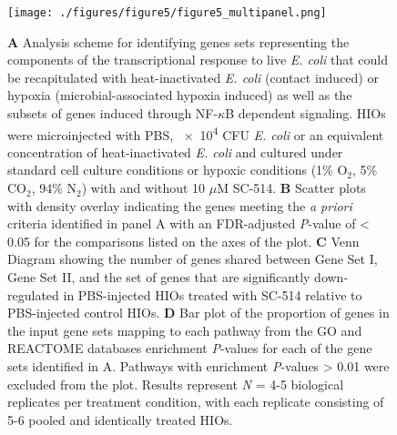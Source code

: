 \documentclass[9pt,lineo]{elife}
\begin{document}
\begin{figure}
\begin{fullwidth}
\centering
\texttt{[image: ./figures/figure5/figure5\_multipanel.png]}
\caption{\textbf{A} Analysis scheme for identifying genes sets representing the components of the transcriptional response to live \textit{E. coli} that could be recapitulated with heat-inactivated \textit{E. coli} (contact induced) or hypoxia (microbial-associated hypoxia induced) as well as the subsets of genes induced through NF-$\kappa$B dependent signaling. HIOs were microinjected with PBS, \num{e4} CFU \textit{E. coli} or an equivalent concentration of heat-inactivated \textit{E. coli} and cultured under standard cell culture conditions or hypoxic conditions (1\% O$_{2}$, 5\% CO$_{2}$, 94\% N$_{2}$) with and without 10 $\mu$M SC-514. \textbf{B} Scatter plots with density overlay indicating the genes meeting the \textit{a priori} criteria identified in panel A with an FDR-adjusted \textit{P}-value of < 0.05 for the comparisons listed on the axes of the plot. \textbf{C} Venn Diagram showing the number of genes shared between Gene Set I, Gene Set II, and the set of genes that are significantly down-regulated in PBS-injected HIOs treated with SC-514 relative to PBS-injected control HIOs. \textbf{D} Bar plot of the proportion of genes in the input gene sets mapping to each pathway from the GO and REACTOME databases enrichment \textit{P}-values for each of the gene sets identified in A. Pathways with enrichment \textit{P}-values > 0.01 were excluded from the plot. Results represent \textit{N} = 4-5 biological replicates per treatment condition, with each replicate consisting of 5-6 pooled and identically treated HIOs. }
\label{fig:fullwidth}
\end{fullwidth}
\end{figure}
\end{document}
